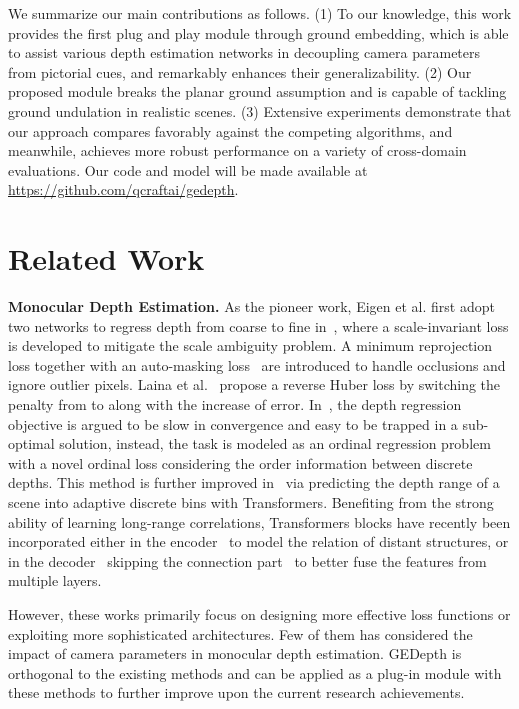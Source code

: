 \documentclass[10pt,twocolumn,letterpaper]{article}
\begin{document}
We summarize our main contributions as follows. (1) To our knowledge, this work provides the first plug and play module through ground embedding, which is able to assist various depth estimation networks in decoupling camera parameters from pictorial cues, and remarkably enhances their generalizability. (2) Our proposed module breaks the planar ground assumption and is capable of tackling ground undulation in realistic scenes. (3) Extensive experiments demonstrate that our approach compares favorably against the competing algorithms, and meanwhile, achieves more robust performance on a variety of cross-domain evaluations. Our code and model will be made available at \url{https://github.com/qcraftai/gedepth}.

\section{Related Work}
\label{sec:related_work}
\noindent\textbf{Monocular Depth Estimation.} 
As the pioneer work, Eigen et al. first adopt two networks to regress depth from coarse to fine in~\cite{eigen2014depth}, where a scale-invariant loss is developed to mitigate the scale ambiguity problem. 
A minimum reprojection loss together with an auto-masking loss~\cite{godard2019digging} are introduced to handle occlusions and ignore outlier pixels. 
Laina et al.~\cite{laina2016deeper} propose a reverse Huber loss by switching the penalty from  to  along with the increase of error. 
In~\cite{fu2018deep}, the depth regression objective is argued to be slow in convergence and easy to be trapped in a sub-optimal solution, instead, the task is modeled as an ordinal regression problem with a novel ordinal loss considering the order information between discrete depths. 
This method is further improved in~\cite{bhat2021adabins} via predicting the depth range of a scene into adaptive discrete bins with Transformers. Benefiting from the strong ability of learning long-range correlations, Transformers blocks have recently been incorporated either in the encoder~\cite{li2022depthformer} to model the relation of distant structures, or in the decoder~\cite{li2022binsformer} skipping the connection part~\cite{agarwal2023attention} to better fuse the features from multiple layers. 

However, these works primarily focus on designing more effective loss functions or exploiting more sophisticated architectures. Few of them has considered the impact of camera parameters in monocular depth estimation. GEDepth is orthogonal to the existing methods and can be applied as a plug-in module with these methods to further improve upon the current research achievements.    
\end{document}
